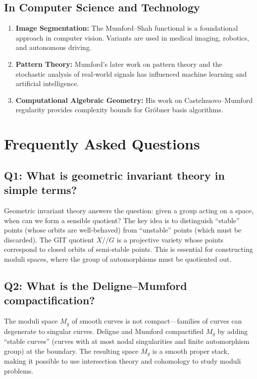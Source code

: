 \subsection{In Computer Science and Technology}

\begin{enumerate}
    \item \textbf{Image Segmentation:} The Mumford--Shah functional is a foundational approach in computer vision. Variants are used in medical imaging, robotics, and autonomous driving.
    \item \textbf{Pattern Theory:} Mumford's later work on pattern theory and the stochastic analysis of real-world signals has influenced machine learning and artificial intelligence.
    \item \textbf{Computational Algebraic Geometry:} His work on Castelnuovo--Mumford regularity provides complexity bounds for Gr\"obner basis algorithms.
\end{enumerate}

\section{Frequently Asked Questions}

\subsection*{Q1: What is geometric invariant theory in simple terms?}
Geometric invariant theory answers the question: given a group acting on a space, when can we form a sensible quotient? The key idea is to distinguish ``stable'' points (whose orbits are well-behaved) from ``unstable'' points (which must be discarded). The GIT quotient $X/\!/G$ is a projective variety whose points correspond to closed orbits of semi-stable points. This is essential for constructing moduli spaces, where the group of automorphisms must be quotiented out.

\subsection*{Q2: What is the Deligne--Mumford compactification?}
The moduli space $M_g$ of smooth curves is not compact---families of curves can degenerate to singular curves. Deligne and Mumford compactified $M_g$ by adding ``stable curves'' (curves with at most nodal singularities and finite automorphism group) at the boundary. The resulting space $\overline{M}_g$ is a smooth proper stack, making it possible to use intersection theory and cohomology to study moduli problems.


